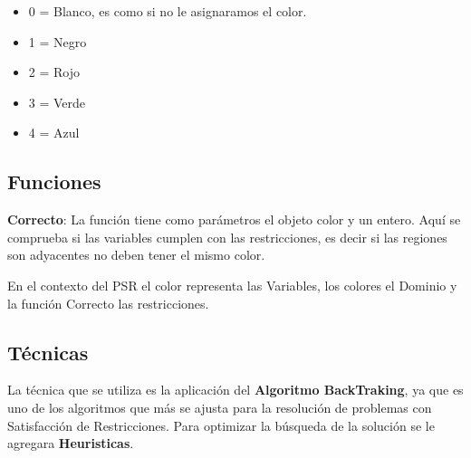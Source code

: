 \documentclass[a4paper]{article}
\begin{document}
\begin{itemize}
	
\item 0 = Blanco, es como si no le asignaramos el color.
\item 1 = Negro
\item 2 = Rojo 
\item 3 = Verde 
\item 4 = Azul
\end{itemize}

\subsection{Funciones}
\textbf{Correcto}: La función tiene como parámetros el objeto color y un entero. Aquí se comprueba si las variables cumplen con las restricciones, es decir si las regiones son adyacentes no deben tener el mismo color. 

En el contexto del PSR el color representa las Variables, los colores el Dominio y la función Correcto las restricciones.

\subsection{Técnicas}
La técnica que se utiliza es la aplicación del \textbf{Algoritmo BackTraking}, ya que es uno de los algoritmos que más se ajusta para la resolución de problemas con Satisfacción de Restricciones.
Para optimizar la búsqueda de la solución se le agregara \textbf{Heuristicas}.
\bigskip
\end{document}
